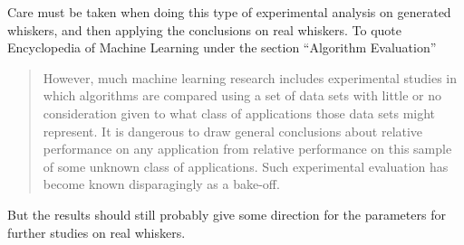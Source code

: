 
Care must be taken when doing this type of experimental analysis on generated whiskers, and then
applying the conclusions on real whiskers. 
To quote Encyclopedia of Machine Learning\cite{EncyclopediaMachineLearning} under the section ``Algorithm Evaluation''
\begin{quote}
    However, much machine learning
    research includes experimental studies in which algorithms 
    are compared using a set of data sets with little
    or no consideration given to what class of applications
    those data sets might represent. It is dangerous to draw
    general conclusions about relative performance on any
    application from relative performance on this sample
    of some unknown class of applications. Such experimental
    evaluation has become known disparagingly as a bake-off.
\end{quote}

But the results should still probably give some direction for the parameters for further studies on real whiskers.




%








%
%
%
%
%
%
%

%
% 
%
%
%
%
%






